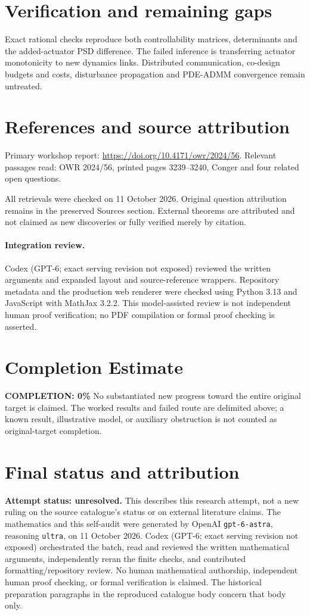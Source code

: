 \documentclass[11pt]{article}
\begin{document}
\section{Verification and remaining gaps}
Exact rational checks reproduce both controllability matrices, determinants and the added-actuator PSD difference. The failed inference is transferring actuator monotonicity to new dynamics links. Distributed communication, co-design budgets and costs, disturbance propagation and PDE-ADMM convergence remain untreated.

\section{References and source attribution}
Primary workshop report: \url{https://doi.org/10.4171/owr/2024/56}. Relevant passages read: OWR 2024/56, printed pages 3239--3240, Conger and four related open questions.

All retrievals were checked on 11 October 2026. Original question attribution remains in the preserved Sources section. External theorems are attributed and not claimed as new discoveries or fully verified merely by citation.


\paragraph{Integration review.} Codex (GPT-6; exact serving revision not exposed) reviewed the written arguments and expanded layout and source-reference wrappers. Repository metadata and the production web renderer were checked using Python 3.13 and JavaScript with MathJax 3.2.2. This model-assisted review is not independent human proof verification; no PDF compilation or formal proof checking is asserted.

\section{Completion Estimate}
\noindent\textbf{COMPLETION: 0\%}
No substantiated new progress toward the entire original target is claimed. The worked results and failed route are delimited above; a known result, illustrative model, or auxiliary obstruction is not counted as original-target completion.

\section{Final status and attribution}
\textbf{Attempt status: unresolved.} This describes this research attempt, not a new ruling on the source catalogue's status or on external literature claims.
The mathematics and this self-audit were generated by OpenAI \texttt{gpt-6-astra}, reasoning \texttt{ultra}, on 11 October 2026. Codex (GPT-6; exact serving revision not exposed) orchestrated the batch, read and reviewed the written mathematical arguments, independently reran the finite checks, and contributed formatting/repository review. No human mathematical authorship, independent human proof checking, or formal verification is claimed. The historical preparation paragraphs in the reproduced catalogue body concern that body only.
\end{document}
